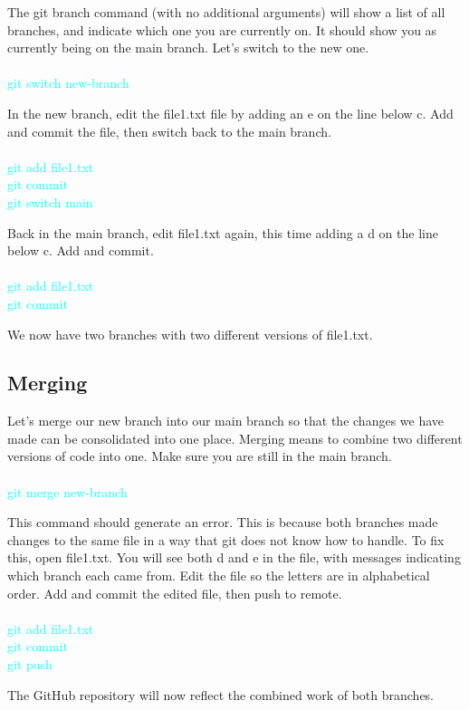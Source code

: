 \documentclass[10pt,twocolumn]{article}
\begin{document}
The git branch command (with no additional arguments) will show a list of all branches, and indicate which one you are currently on. It should show you as currently being on the main branch. Let’s switch to the new one. \\\\
\textcolor{cyan}{
git switch new-branch\\
}

In the new branch, edit the file1.txt file by adding an e on the line below c. Add and commit the file, then switch back to the main branch.\\\\
\textcolor{cyan}{
git add file1.txt\\
git commit\\
git switch main\\
}

Back in the main branch, edit file1.txt again, this time adding a d on the line below c. Add and commit.\\\\
\textcolor{cyan}{
git add file1.txt\\
git commit\\
}

We now have two branches with two different versions of file1.txt.


\subsection{Merging }

Let’s merge our new branch into our main branch so that the changes we have made can be consolidated into one place. Merging means to combine two different versions of code into one. Make sure you are still in the main branch.\\\\
\textcolor{cyan}{
git merge new-branch\\
}

This command should generate an error. This is because both branches made changes to the same file in a way that git does not know how to handle. To fix this, open file1.txt. You will see both d and e in the file, with messages indicating which branch each came from. Edit the file so the letters are in alphabetical order. Add and commit the edited file, then push to remote. \\\\
\textcolor{cyan}{
git add file1.txt\\
git commit\\
git push\\
}

The GitHub repository will now reflect the combined work of both branches. 
\end{document}
